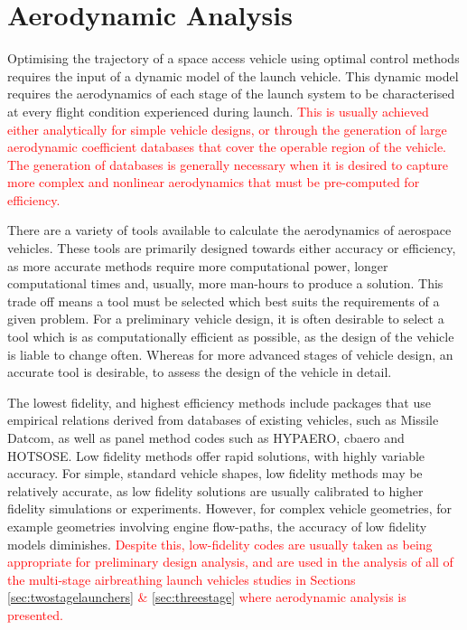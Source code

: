  







\section{Aerodynamic Analysis}

Optimising the trajectory of a space access vehicle using optimal control methods requires the input of a dynamic model of the launch vehicle. 
This dynamic model requires the aerodynamics of each stage of the launch system to be characterised at every flight condition experienced during launch. \textcolor{red}{This is usually achieved either analytically for simple vehicle designs, or through the generation of large aerodynamic coefficient databases that cover the operable region of the vehicle. The generation of databases is generally necessary when it is desired to capture more complex and nonlinear aerodynamics that must be pre-computed for efficiency.}

There are a variety of tools available to calculate the aerodynamics of aerospace vehicles.
 These tools are primarily designed towards either accuracy or efficiency, as more accurate methods require more computational power, longer computational times and, usually, more man-hours to produce a solution. 
This trade off means a tool must be selected which best suits the requirements of a given problem. 
For a preliminary vehicle design, it is often desirable to select a tool which is as computationally efficient as possible, as the design of the vehicle is liable to change often. 
Whereas for more advanced stages of vehicle design, an accurate tool is desirable, to assess the design of the vehicle in detail. 

The lowest fidelity, and highest efficiency methods include packages that use empirical relations derived from databases of existing vehicles, such as Missile Datcom\cite{Rosema2011}, as well as panel method codes such as HYPAERO\cite{Preller2017b}, cbaero\cite{Kinney2004} and HOTSOSE\cite{hotsose}. Low fidelity methods offer rapid solutions, with highly variable accuracy. For simple, standard vehicle shapes, low fidelity methods may be relatively accurate, as low fidelity solutions are usually calibrated to higher fidelity simulations or experiments. However, for complex vehicle geometries, for example geometries involving engine flow-paths, the accuracy of low fidelity models diminishes\cite{Krause2011}. \textcolor{red}{Despite this, low-fidelity codes are usually taken as being appropriate for preliminary design analysis, and are used in the analysis of all of the multi-stage airbreathing launch vehicles studies in Sections \ref{sec:twostagelaunchers} \& \ref{sec:threestage} where aerodynamic analysis is presented\cite{Wilhite1991,Fujikawa2017,Mehta2001,Takahashi1997,Germain2001,Eklund2012,Bradford2002,Kimura1999,Preller2018a}.} 

